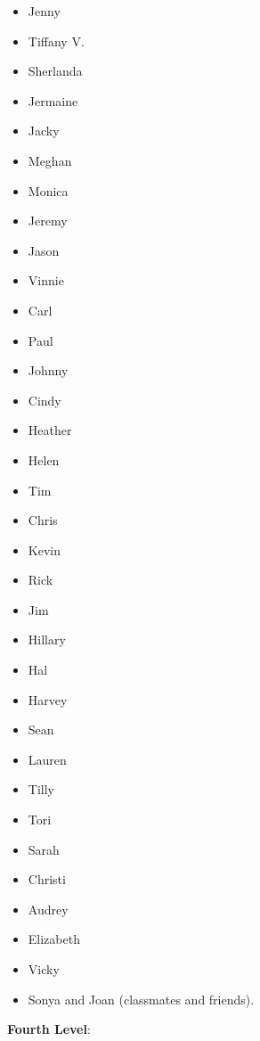 \begin{multicols}{2}
\begin{itemize}[leftmargin=*]
\item Jenny
 \item Tiffany V.
 \item Sherlanda
 \item Jermaine
 \item Jacky
 \item Meghan
 \item Monica
 \item Jeremy
 \item Jason
 \item Vinnie
 \item Carl
 \item Paul
 \item Johnny
 \item Cindy
 \item Heather
 \item Helen
 \item Tim
 \item Chris
 \item Kevin
 \item Rick
 \item Jim
 \item Hillary
 \item Hal
 \item Harvey
 \item Sean
 \item Lauren
 \item Tilly
 \item Tori
 \item Sarah
 \item Christi
 \item Audrey
 \item Elizabeth
 \item Vicky
 \item Sonya and Joan \break(classmates and friends).
 \end{itemize}
 \end{multicols}
\pagebreak  \textbf{Fourth Level}:
